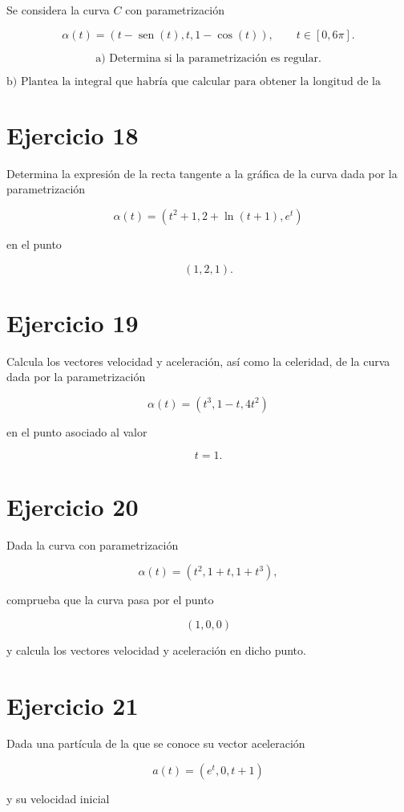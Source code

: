 \documentclass[11pt,a4paper]{article}
\newcommand{\sen}{\operatorname{sen}}
\begin{document}
Se considera la curva \(C\) con parametrización

\[
\alpha(t)
=
(t-\sen(t),t,1-\cos(t)),
\qquad
t\in[0,6\pi].
\]

\[
\text{a) Determina si la parametrización es regular.}
\]

\[
\text{b) Plantea la integral que habría que calcular para obtener la longitud de la curva.}
\]

\section{Ejercicio 18}

Determina la expresión de la recta tangente a la gráfica de la curva dada por la parametrización

\[
\alpha(t)
=
(t^2+1,2+\ln(t+1),e^t)
\]

en el punto

\[
(1,2,1).
\]

\section{Ejercicio 19}

Calcula los vectores velocidad y aceleración, así como la celeridad, de la curva dada por la parametrización

\[
\alpha(t)
=
(t^3,1-t,4t^2)
\]

en el punto asociado al valor

\[
t=1.
\]

\section{Ejercicio 20}

Dada la curva con parametrización

\[
\alpha(t)
=
(t^2,1+t,1+t^3),
\]

comprueba que la curva pasa por el punto

\[
(1,0,0)
\]

y calcula los vectores velocidad y aceleración en dicho punto.

\section{Ejercicio 21}

Dada una partícula de la que se conoce su vector aceleración

\[
a(t)
=
(e^t,0,t+1)
\]

y su velocidad inicial
\end{document}
